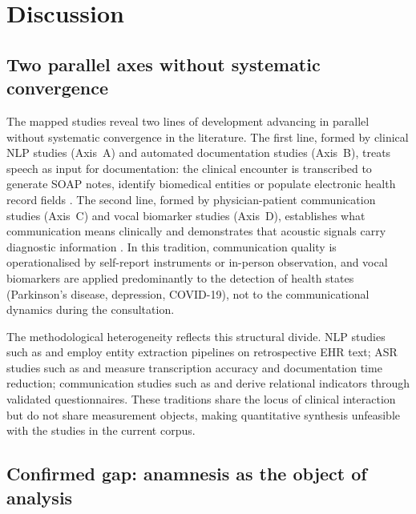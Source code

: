 \documentclass[review,12pt]{elsarticle}
\begin{document}
\section{Discussion}
\label{sec:discussao}


\subsection*{Two parallel axes without systematic convergence}

The mapped studies reveal two lines of development advancing in parallel
without systematic convergence in the literature.
The first line, formed by clinical NLP studies (Axis~A) and automated
documentation studies (Axis~B), treats speech as input for documentation:
the clinical encounter is transcribed to generate SOAP notes, identify
biomedical entities or populate electronic health record fields
\citep{Bazoge2023,vanBuchem2021,Falcetta2023,Ng2025}.
The second line, formed by physician-patient communication studies (Axis~C)
and vocal biomarker studies (Axis~D), establishes what communication means
clinically and demonstrates that acoustic signals carry diagnostic information
\citep{Kelley2014,Fagherazzi2021,Albert2024}.
In this tradition, communication quality is operationalised by self-report
instruments or in-person observation, and vocal biomarkers are applied
predominantly to the detection of health states (Parkinson's disease,
depression, COVID-19), not to the communicational dynamics during the
consultation.

The methodological heterogeneity reflects this structural divide.
NLP studies such as \citet{Bazoge2023} and
\citet{Wang2018} employ entity extraction pipelines on retrospective
EHR text; ASR studies such as \citet{vanBuchem2021} and
\citet{Klusty2025} measure transcription accuracy and documentation time
reduction; communication studies such as \citet{Shao2025} and
\citet{Kelley2014} derive relational indicators through validated
questionnaires. These traditions share the locus of clinical interaction
but do not share measurement objects, making quantitative synthesis
unfeasible with the studies in the current corpus.

\subsection*{Confirmed gap: anamnesis as the object of analysis}
\end{document}
